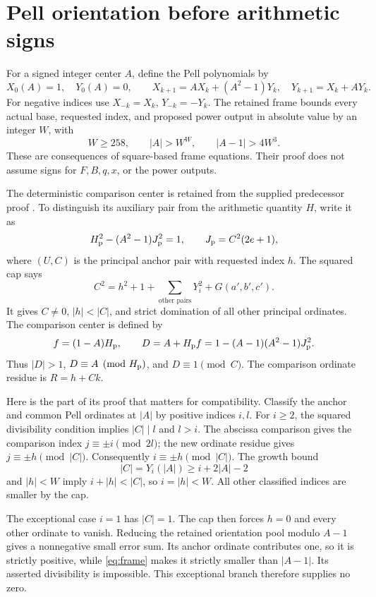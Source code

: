 \documentclass[11pt]{article}
\theoremstyle{definition}\newtheorem{definition}[theorem]{Definition}
\begin{document}
\section{Pell orientation before arithmetic signs}

For a signed integer center \(A\), define the Pell polynomials by
\[
 X_0(A)=1,\quad Y_0(A)=0,\qquad
 X_{k+1}=AX_k+(A^2-1)Y_k,\quad Y_{k+1}=X_k+AY_k.
\]
For negative indices use \(X_{-k}=X_k\), \(Y_{-k}=-Y_k\).
The retained frame bounds every actual base, requested index, and proposed
power output in absolute value by an integer \(W\), with
\begin{equation}\label{eq:frame}
 W\ge258,\qquad |A|>W^W,\qquad |A-1|>4W^3.
\end{equation}
These are consequences of square-based frame equations. Their proof does
not assume signs for \(F,B,q,x\), or the power outputs.

The deterministic comparison center is retained from the supplied
predecessor proof \cite{symmetric}. To distinguish its auxiliary pair
from the arithmetic quantity \(H\), write it as
\[
 H_{\rm p}^2-(A^2-1)J_{\rm p}^2=1,\qquad
 J_{\rm p}=C^2(2e+1),
\]
where \((U,C)\) is the principal anchor pair with requested index \(h\).
The squared cap says
\[
 C^2=h^2+1+\sum_{\text{other pairs}}Y_i^2+G(a',b',c').
\]
It gives \(C\ne0\), \(|h|<|C|\), and strict domination of all other
principal ordinates. The comparison center is defined by
\[
 f=(1-A)H_{\rm p},\qquad D=A+H_{\rm p}f
    =1-(A-1)(A^2-1)J_{\rm p}^2.
\]
Thus \(|D|>1\), \(D\equiv A\pmod{H_{\rm p}}\), and \(D\equiv1\pmod C\).
The comparison ordinate residue is \(R=h+Ck\).

Here is the part of its proof that matters for compatibility. Classify
the anchor and common Pell ordinates at \(|A|\) by positive indices
\(i,l\). For \(i\ge2\), the squared divisibility condition implies
\(|C|\mid l\) and \(l>i\). The abscissa comparison gives the comparison
index \(j\equiv\pm i\pmod{2l}\); the new ordinate residue gives
\(j\equiv\pm h\pmod{|C|}\). Consequently
\(i\equiv\pm h\pmod{|C|}\). The growth bound
\[
 |C|=Y_i(|A|)\ge i+2|A|-2
\]
and \(|h|<W\) imply \(i+|h|<|C|\), so \(i=|h|<W\).
All other classified indices are smaller by the cap.

The exceptional case \(i=1\) has \(|C|=1\). The cap then forces \(h=0\)
and every other ordinate to vanish. Reducing the retained orientation
pool modulo \(A-1\) gives a nonnegative small error sum. Its anchor
ordinate contributes one, so it is strictly positive, while
\eqref{eq:frame} makes it strictly smaller than \(|A-1|\).
Its asserted divisibility is impossible. This exceptional branch
therefore supplies no zero.
\end{document}

